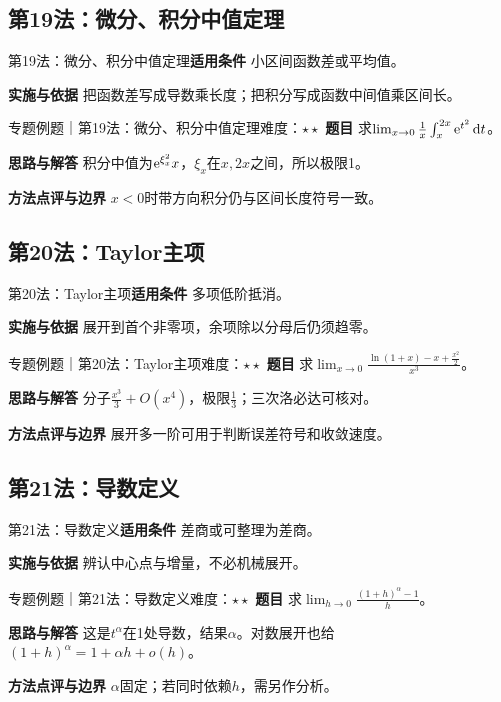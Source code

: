 \subsection{第19法：微分、积分中值定理}\label{mat:limits_35:k19}
\begin{method}{第19法：微分、积分中值定理}\textbf{适用条件} 小区间函数差或平均值。\par\textbf{实施与依据} 把函数差写成导数乘长度；把积分写成函数中间值乘区间长。\end{method}
\begin{example}{专题例题｜第19法：微分、积分中值定理}{难度：$\star\star$}
\textbf{题目} 求$\lim_{x\to0}\frac1x\int_x^{2x}\mathrm{e}^{t^2}\mathop{}\!\mathrm{d} t$。\par\textbf{思路与解答} 积分中值为$\mathrm{e}^{\xi_x^2}x$，$\xi_x$在$x,2x$之间，所以极限1。\par\textbf{方法点评与边界} $x<0$时带方向积分仍与区间长度符号一致。
\end{example}
\subsection{第20法：Taylor主项}\label{mat:limits_35:k20}
\begin{method}{第20法：Taylor主项}\textbf{适用条件} 多项低阶抵消。\par\textbf{实施与依据} 展开到首个非零项，余项除以分母后仍须趋零。\end{method}
\begin{example}{专题例题｜第20法：Taylor主项}{难度：$\star\star$}
\textbf{题目} 求$\lim_{x\to0}\frac{\ln(1+x)-x+\frac{x^2}{2}}{x^3}$。\par\textbf{思路与解答} 分子$\frac{x^3}{3}+O(x^4)$，极限$\frac{1}{3}$；三次洛必达可核对。\par\textbf{方法点评与边界} 展开多一阶可用于判断误差符号和收敛速度。
\end{example}
\subsection{第21法：导数定义}\label{mat:limits_35:k21}
\begin{method}{第21法：导数定义}\textbf{适用条件} 差商或可整理为差商。\par\textbf{实施与依据} 辨认中心点与增量，不必机械展开。\end{method}
\begin{example}{专题例题｜第21法：导数定义}{难度：$\star\star$}
\textbf{题目} 求$\lim_{h\to0}\frac{(1+h)^\alpha-1}{h}$。\par\textbf{思路与解答} 这是$t^\alpha$在1处导数，结果$\alpha$。对数展开也给$(1+h)^\alpha=1+\alpha h+o(h)$。\par\textbf{方法点评与边界} $\alpha$固定；若同时依赖$h$，需另作分析。
\end{example}
